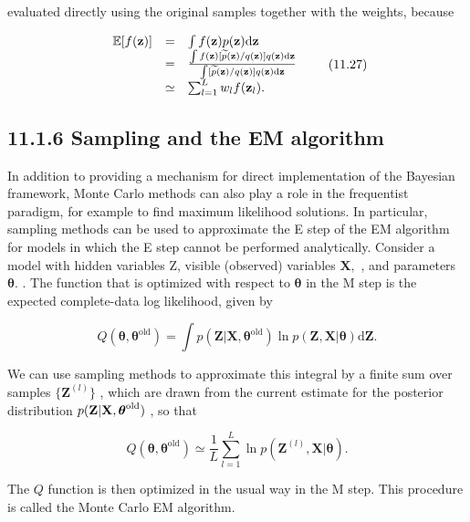 \documentclass[
  10
]{article}
\begin{document}
evaluated directly using the original samples together with the weights,
because

\[
\begin{array}{r c l} \mathbb {E} [ f (\mathbf {z}) ] & = & \int f (\mathbf {z}) p (\mathbf {z})   \mathrm{d} \mathbf {z} \\ & = & \frac {\int f (\mathbf {z}) [ \widetilde {p} (\mathbf {z}) / q (\mathbf {z}) ] q (\mathbf {z})   \mathrm{d} \mathbf {z}}{\int [ \widetilde {p} (\mathbf {z}) / q (\mathbf {z}) ] q (\mathbf {z})   \mathrm{d} \mathbf {z}} \\ & \simeq & \sum_ {l = 1} ^ {L} w _ {l} f (\mathbf {z} _ {l}). \end{array}\tag{11.27}
\]

\subsection{11.1.6 Sampling and the EM
algorithm}\label{sampling-and-the-em-algorithm}

In addition to providing a mechanism for direct implementation of the
Bayesian framework, Monte Carlo methods can also play a role in the
frequentist paradigm, for example to find maximum likelihood solutions.
In particular, sampling methods can be used to approximate the E step of
the EM algorithm for models in which the E step cannot be performed
analytically. Consider a model with hidden variables Z, visible
(observed) variables \(\mathbf { X } ,\) , and parameters
\(\pmb { \theta } .\) . The function that is optimized with respect to
\(\pmb \theta\) in the M step is the expected complete-data log
likelihood, given by

\[
Q (\pmb {\theta}, \pmb {\theta} ^ {\mathrm{old}}) = \int p (\mathbf {Z} | \mathbf {X}, \pmb {\theta} ^ {\mathrm{old}}) \ln p (\mathbf {Z}, \mathbf {X} | \pmb {\theta}) \mathrm{d} \mathbf {Z}.\tag{11.28}
\]

We can use sampling methods to approximate this integral by a finite sum
over samples \(\{ \mathbf { Z } ^ { ( l ) } \}\) , which are drawn from
the current estimate for the posterior distribution
\(p ( { \bf Z } | { \bf X } , \boldsymbol { \theta } ^ { \mathrm { o l d } } )\)
, so that

\[
Q (\boldsymbol {\theta}, \boldsymbol {\theta} ^ {\mathrm{old}}) \simeq \frac {1}{L} \sum_ {l = 1} ^ {L} \ln p (\mathbf {Z} ^ {(l)}, \mathbf {X} | \boldsymbol {\theta}).\tag{11.29}
\]

The \(Q\) function is then optimized in the usual way in the M step.
This procedure is called the Monte Carlo EM algorithm.
\end{document}
